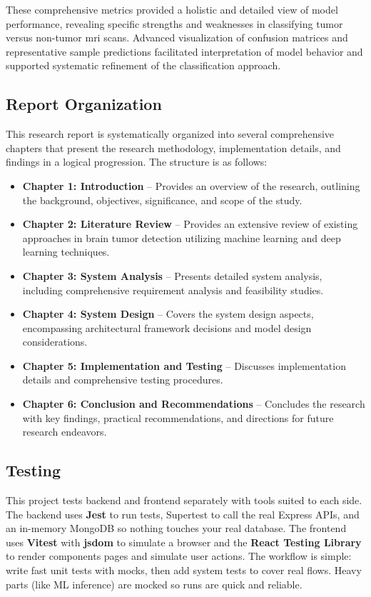 These comprehensive metrics provided a holistic and detailed view of model
performance, revealing specific strengths and weaknesses in classifying tumor
versus non-tumor \gls{mri} scans. Advanced visualization of confusion matrices
and representative sample predictions facilitated interpretation of model
behavior and supported systematic refinement of the classification approach.

\subsection{Report Organization}
This research report is systematically organized into several comprehensive
chapters that present the research methodology, implementation details, and
findings in a logical progression. The structure is as follows:

\begin{itemize}

    \item \textbf{Chapter 1: Introduction} – Provides an overview of the research, outlining the background, objectives, significance, and scope of the study.

    \item \textbf{Chapter 2: Literature Review} – Provides an extensive review of existing approaches in brain tumor detection utilizing machine learning and deep learning techniques.

    \item \textbf{Chapter 3: System Analysis} – Presents detailed system analysis, including comprehensive requirement analysis and feasibility studies.

    \item \textbf{Chapter 4: System Design} – Covers the system design aspects, encompassing architectural framework decisions and model design considerations.

    \item \textbf{Chapter 5: Implementation and Testing} – Discusses implementation details and comprehensive testing procedures.

    \item \textbf{Chapter 6: Conclusion and Recommendations} – Concludes the research with key findings, practical recommendations, and directions for future research endeavors.

\end{itemize}

\subsection{Testing}
This project tests backend and frontend separately with tools suited to each
side. The backend uses \textbf{Jest} to run tests, Supertest to call the real
Express APIs, and an in-memory MongoDB so nothing touches your real database.
The frontend uses \textbf{Vitest} with \textbf{jsdom} to simulate a browser and
the \textbf{React Testing Library} to render components pages and simulate user
actions. The workflow is simple: write fast unit tests with mocks, then add
system tests to cover real flows. Heavy parts (like ML inference) are mocked so
runs are quick and reliable.


